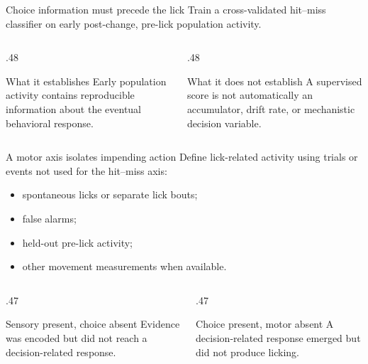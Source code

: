 \documentclass[aspectratio=169,10pt]{beamer}
\begin{document}
\begin{frame}{Choice information must precede the lick}
  Train a cross-validated hit--miss classifier on early post-change,
  pre-lick population activity.

  \vspace{.8em}
  \begin{columns}[T,onlytextwidth]
    \begin{column}{.48\textwidth}
      \begin{block}{What it establishes}
        Early population activity contains reproducible information about the
        eventual behavioral response.
      \end{block}
    \end{column}
    \begin{column}{.48\textwidth}
      \begin{alertblock}{What it does not establish}
        A supervised score is not automatically an accumulator, drift rate, or
        mechanistic decision variable.
      \end{alertblock}
    \end{column}
  \end{columns}

\end{frame}

\begin{frame}{A motor axis isolates impending action}
  Define lick-related activity using trials or events not used for the
  hit--miss axis:
  \begin{itemize}
    \item spontaneous licks or separate lick bouts;
    \item false alarms;
    \item held-out pre-lick activity;
    \item other movement measurements when available.
  \end{itemize}

  \begin{columns}[T,onlytextwidth]
    \begin{column}{.47\textwidth}
      \begin{block}{Sensory present, choice absent}
        Evidence was encoded but did not reach a decision-related response.
      \end{block}
    \end{column}
    \begin{column}{.47\textwidth}
      \begin{exampleblock}{Choice present, motor absent}
        A decision-related response emerged but did not produce licking.
      \end{exampleblock}
    \end{column}
  \end{columns}
\end{frame}
\end{document}
